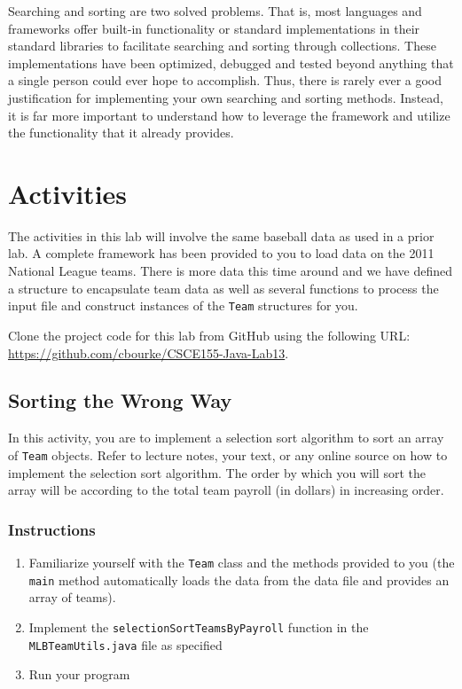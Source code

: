\documentclass[12pt]{scrartcl}
\begin{document}
Searching and sorting are two solved problems.  That is, most 
languages and frameworks offer built-in functionality or 
standard implementations in their standard libraries to facilitate 
searching and sorting through collections.  These implementations 
have been optimized, debugged and tested beyond anything that 
a single person could ever hope to accomplish.  Thus, there is 
rarely ever a good justification for implementing your own 
searching and sorting methods.  Instead, it is far more important 
to understand how to leverage the framework and utilize the 
functionality that it already provides.  

\section{Activities}

The activities in this lab will involve the same baseball data as 
used in a prior lab.  A complete framework has been provided 
to you to load data on the 2011 National League teams.  There 
is more data this time around and we have defined a structure 
to encapsulate team data as well as several functions to process 
the input file and construct instances of the \texttt{Team} 
structures for you.

Clone the project code for this lab from GitHub using the following 
URL: \url{https://github.com/cbourke/CSCE155-Java-Lab13}.

\subsection{Sorting the Wrong Way}

In this activity, you are to implement a selection sort algorithm to 
sort an array of \texttt{Team} objects.  Refer to lecture notes, 
your text, or any online source on how to implement the selection sort 
algorithm.  The order by which you will sort the array will be according 
to the total team payroll (in dollars) in increasing order.

\subsubsection*{Instructions}

\begin{enumerate}
  \item Familiarize yourself with the \texttt{Team} class and 
	the methods provided to you (the \texttt{main} method 
	automatically loads the data from the data file and provides an 
	array of teams).  
  \item Implement the \texttt{selectionSortTeamsByPayroll} 
	function in the \texttt{MLBTeamUtils.java} file as specified
  \item Run your program
\end{enumerate}
\end{document}
